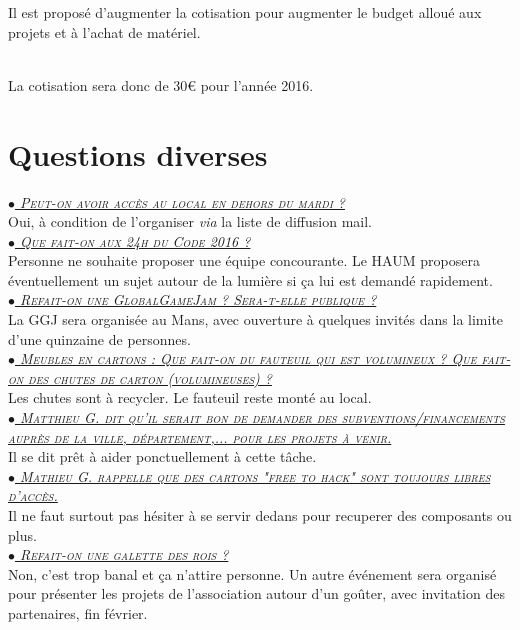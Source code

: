 \documentclass[a4paper, 11pt]{article}
\newcommand\question[2]{\noindent\ul{\textit{\textsc{$\bullet$ #1}}}\\#2\\}
\begin{document}
Il est proposé d'augmenter la cotisation pour augmenter le budget alloué aux projets et à l'achat de matériel.

~\\ La cotisation sera donc de 30\euro{} pour l'année 2016.


\section{Questions diverses}

\question{Peut-on avoir accès au local en dehors du mardi ?}{Oui, à condition de
l'organiser \textit{via} la liste de diffusion mail.}
\question{Que fait-on aux 24h du Code 2016 ?}{Personne ne souhaite proposer une équipe concourante. Le HAUM proposera
éventuellement un sujet autour de la lumière si ça lui est demandé rapidement.}
\question{Refait-on une GlobalGameJam ? Sera-t-elle publique ?}{La GGJ sera
organisée au Mans, avec ouverture à quelques invités dans la limite d'une quinzaine de personnes.}
\question{Meubles en cartons : Que fait-on du fauteuil qui est volumineux ? Que
fait-on des chutes de carton (volumineuses) ?}{Les chutes sont à recycler. Le
fauteuil reste monté au local.}
\question{Matthieu G. dit qu'il serait bon de demander des
subventions/financements auprès de la ville, département,... pour les projets
à venir.}{Il se dit prêt à aider ponctuellement à cette tâche.}
\question{Mathieu G. rappelle que des cartons "free to hack" sont toujours libres d'accès.}{Il ne faut surtout pas hésiter à se servir dedans pour recuperer des composants
ou plus.}
\question{Refait-on une galette des rois ?}{Non, c'est trop banal et ça
n'attire personne. Un autre événement sera organisé pour présenter les projets
de l'association autour d'un goûter, avec invitation des partenaires, fin février.}
\end{document}
